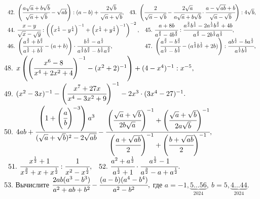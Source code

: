 $\begin{array}{ll}
42.\ \left(\cfrac{a\sqrt{a}+b\sqrt{b}}{\sqrt{a}+\sqrt{b}}-\sqrt{ab}\right):(a-b)+\cfrac{2\sqrt{b}}{\sqrt{a}+\sqrt{b}},&
43.\ \left(\cfrac{2}{\sqrt{a}-\sqrt{b}}-\cfrac{2\sqrt{a}}{a\sqrt{a}+b\sqrt{b}}\cdot\cfrac{a-\sqrt{ab}+b}{\sqrt{a}-\sqrt{b}}\right):4\sqrt{b},\end{array}$\\
$\begin{array}{ll}
44.\ \cfrac{x-y}{\sqrt{x}-\sqrt{y}}:\left(\left(x^\frac{1}{4}-y^\frac{1}{4}\right)^{-1}+\left(x^\frac{1}{4}+y^\frac{1}{4}\right)^{-1}\right)^{-2},&
45.\ \cfrac{a+8b}{a^\frac{2}{3}-4b^\frac{2}{3}}:\cfrac{a^\frac{2}{3}b^\frac{1}{3}-2a^\frac{1}{3}b^\frac{2}{3}+4b}{a^\frac{2}{3}-2b^\frac{1}{3}a^\frac{1}{3}},\\
46.\ \left(\cfrac{a^{\frac{3}{2}}+b^{\frac{3}{2}}}{a^{\frac{1}{2}}+b^{\frac{1}{2}}}-(a+b)\right)\cdot\cfrac{b^{\frac{1}{2}}-a^{\frac{1}{2}}}{a^{\frac{1}{2}}b^{\frac{3}{2}}-b^{\frac{1}{2}}a^{\frac{3}{2}}},&
47.\ \left(\cfrac{a^{\frac{3}{2}}-b^{\frac{3}{2}}}{a^{\frac{1}{2}}-b^{\frac{1}{2}}}-(a^{\frac{1}{2}}b^{\frac{1}{2}}+2b)\right):\cfrac{ab^{\frac{1}{2}}-ba^{\frac{1}{2}}}{a^{\frac{1}{2}}b^{\frac{1}{2}}},\\
\end{array}$\\
48. $x\left(\left(\cfrac{x^6-8}{x^4+2x^2+4}\right)^{-1}-(x^2+2)^{-1}\right)+(4-x^4)^{-1}:x^{-5},$\\
49. $(x^2-3x)^{-1}-\left(\cfrac{x^7+27x}{x^4-3x^2+9}\right)^{-1}-2x^3\cdot(3x^4-27)^{-1}.$\\
50. $4ab+\cfrac{\left(1+\left(\cfrac{a}{b}\right)^{-3}\right)a^3}{(\sqrt{a}+\sqrt{b})^2-2\sqrt{ab}}-
\cfrac{\left(\cfrac{\sqrt{a}+\sqrt{b}}{2b\sqrt{a}}\right)^{-1}+
\left(\cfrac{\sqrt{a}+\sqrt{b}}{2a\sqrt{b}}\right)^{-1}}{\left(\cfrac{a+\sqrt{ab}}{2}\right)^{-1}+
\left(\cfrac{b+\sqrt{ab}}{2}\right)^{-1}},$\\
$\begin{array}{ll}
51.\ \cfrac{x^\frac{1}{2}+1}{x^\frac{3}{2}+x+x^\frac{1}{2}}:\cfrac{1}{x^2-x^\frac{1}{2}},&
52.\ \cfrac{a^2+a^\frac{1}{2}}{a^\frac{1}{2}+1}\cdot\cfrac{a^\frac{1}{2}-1}{a^\frac{3}{2}-a+a^\frac{1}{2}}.
\end{array}$\\
53. Вычислите $\cfrac{2ab(a^3-b^3)}{a^2+ab+b^2}-\cfrac{(a-b)(a^4-b^4)}{a^2-b^2},$ где $a=-1,\underbrace{5\ldots56}_{2024},\ b=5,\underbrace{4\ldots44}_{2024}.$
\newpage
